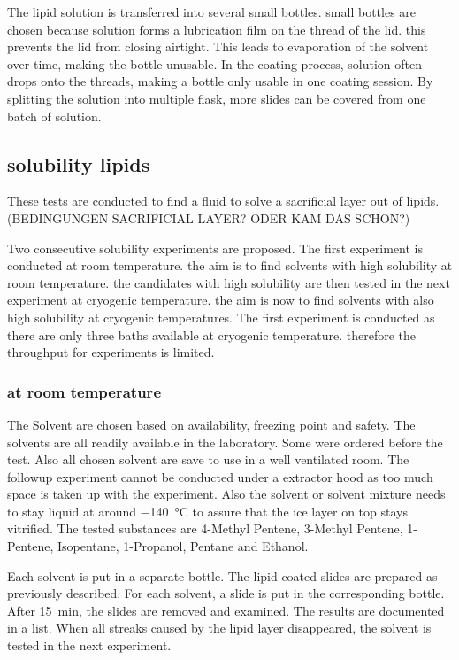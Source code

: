 The lipid solution is transferred into several small bottles. small bottles are chosen because solution forms a lubrication film on the thread of the lid. this prevents the lid from closing airtight. This leads to evaporation of the solvent over time, making the bottle unusable. In the coating process, solution often drops onto the threads, making a bottle only usable in one coating session. By splitting the solution into multiple flask, more slides can be covered from one batch of solution.

\subsection{solubility lipids}

These tests are conducted to find a fluid to solve a sacrificial layer out of lipids. (BEDINGUNGEN SACRIFICIAL LAYER? ODER KAM DAS SCHON?)

Two consecutive solubility experiments are proposed. The first experiment is conducted at room temperature. the aim is to find solvents with high solubility at room temperature. the candidates with high solubility are then tested in the next experiment at cryogenic temperature. the aim is now to find solvents with also high solubility at cryogenic temperatures. The first experiment is conducted as there are only three baths available at cryogenic temperature. therefore the throughput for experiments is limited.

\subsubsection{at room temperature}

The Solvent are chosen based on availability, freezing point and safety. The solvents are all readily available in the laboratory. Some were ordered before the test. Also all chosen solvent are save to use in a well ventilated room. The followup experiment cannot be conducted under a extractor hood as too much space is taken up with the experiment. Also the solvent or solvent mixture needs to stay liquid at around \SI{-140}{\degreeCelsius} to assure that the ice layer on top stays vitrified. The tested substances are 4-Methyl Pentene, 3-Methyl Pentene, 1-Pentene, Isopentane, 1-Propanol, Pentane and Ethanol. 

Each solvent is put in a separate bottle. The lipid coated slides are prepared as previously described. For each solvent, a slide is put in the corresponding bottle. After \SI{15}{\minute}, the slides are removed and examined. The results are documented in a list. When all streaks caused by the lipid layer disappeared, the solvent is tested in the next experiment.

